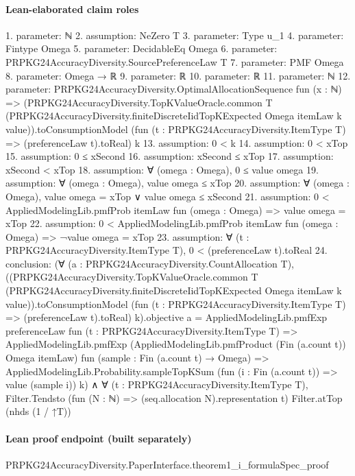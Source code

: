 \documentclass[10pt]{article}
\begin{document}
\paragraph{Lean-elaborated claim roles}\begin{ReviewVerbatim}
1. parameter: ℕ
2. assumption: NeZero T
3. parameter: Type u_1
4. parameter: Fintype Omega
5. parameter: DecidableEq Omega
6. parameter: PRPKG24AccuracyDiversity.SourcePreferenceLaw T
7. parameter: PMF Omega
8. parameter: Omega → ℝ
9. parameter: ℝ
10. parameter: ℝ
11. parameter: ℕ
12. parameter: PRPKG24AccuracyDiversity.OptimalAllocationSequence fun (x : ℕ) =>
  (PRPKG24AccuracyDiversity.TopKValueOracle.common T
        (PRPKG24AccuracyDiversity.finiteDiscreteIidTopKExpected Omega itemLaw k value)).toConsumptionModel
    (fun (t : PRPKG24AccuracyDiversity.ItemType T) => (preferenceLaw t).toReal) k
13. assumption: 0 < k
14. assumption: 0 < xTop
15. assumption: 0 ≤ xSecond
16. assumption: xSecond ≤ xTop
17. assumption: xSecond < xTop
18. assumption: ∀ (omega : Omega), 0 ≤ value omega
19. assumption: ∀ (omega : Omega), value omega ≤ xTop
20. assumption: ∀ (omega : Omega), value omega = xTop ∨ value omega ≤ xSecond
21. assumption: 0 < AppliedModelingLib.pmfProb itemLaw fun (omega : Omega) => value omega = xTop
22. assumption: 0 < AppliedModelingLib.pmfProb itemLaw fun (omega : Omega) => ¬value omega = xTop
23. assumption: ∀ (t : PRPKG24AccuracyDiversity.ItemType T), 0 < (preferenceLaw t).toReal
24. conclusion: (∀ (a : PRPKG24AccuracyDiversity.CountAllocation T),
    ((PRPKG24AccuracyDiversity.TopKValueOracle.common T
                (PRPKG24AccuracyDiversity.finiteDiscreteIidTopKExpected Omega itemLaw k value)).toConsumptionModel
            (fun (t : PRPKG24AccuracyDiversity.ItemType T) => (preferenceLaw t).toReal) k).objective
        a =
      AppliedModelingLib.pmfExp preferenceLaw fun (t : PRPKG24AccuracyDiversity.ItemType T) =>
        AppliedModelingLib.pmfExp (AppliedModelingLib.pmfProduct (Fin (a.count t)) Omega itemLaw)
          fun (sample : Fin (a.count t) → Omega) =>
          AppliedModelingLib.Probability.sampleTopKSum (fun (i : Fin (a.count t)) => value (sample i)) k) ∧
  ∀ (t : PRPKG24AccuracyDiversity.ItemType T),
    Filter.Tendsto (fun (N : ℕ) => (seq.allocation N).representation t) Filter.atTop (nhds (1 / ↑T))
\end{ReviewVerbatim}

\paragraph{Lean proof endpoint (built separately)}\begin{ReviewVerbatim}
PRPKG24AccuracyDiversity.PaperInterface.theorem1_i_formulaSpec_proof
\end{ReviewVerbatim}
\end{document}
